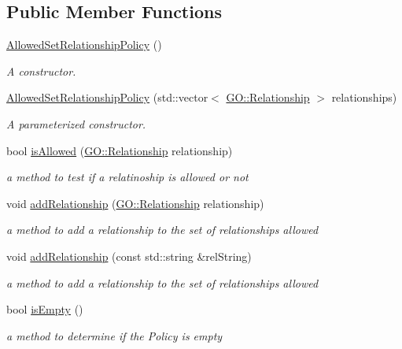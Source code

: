 \subsection*{Public Member Functions}
\begin{DoxyCompactItemize}
\item 
\hyperlink{classAllowedSetRelationshipPolicy_aebffb7e69930219d89133625ff8936cf}{Allowed\+Set\+Relationship\+Policy} ()
\begin{DoxyCompactList}\small\item\em A constructor. \end{DoxyCompactList}\item 
\hyperlink{classAllowedSetRelationshipPolicy_a9cd20d2c44a96736c0a74b7e962dae04}{Allowed\+Set\+Relationship\+Policy} (std\+::vector$<$ \hyperlink{namespaceGO_aaa3905b2e000a8be411da8038827f993}{G\+O\+::\+Relationship} $>$ relationships)
\begin{DoxyCompactList}\small\item\em A parameterized constructor. \end{DoxyCompactList}\item 
bool \hyperlink{classAllowedSetRelationshipPolicy_ac7454bc649241219f076779330977f90}{is\+Allowed} (\hyperlink{namespaceGO_aaa3905b2e000a8be411da8038827f993}{G\+O\+::\+Relationship} relationship)
\begin{DoxyCompactList}\small\item\em a method to test if a relatinoship is allowed or not \end{DoxyCompactList}\item 
void \hyperlink{classAllowedSetRelationshipPolicy_a5da8f3fb718fba44354e56a4595968de}{add\+Relationship} (\hyperlink{namespaceGO_aaa3905b2e000a8be411da8038827f993}{G\+O\+::\+Relationship} relationship)
\begin{DoxyCompactList}\small\item\em a method to add a relationship to the set of relationships allowed \end{DoxyCompactList}\item 
void \hyperlink{classAllowedSetRelationshipPolicy_a013089769911f87f1d8513bc6006dbf9}{add\+Relationship} (const std\+::string \&rel\+String)
\begin{DoxyCompactList}\small\item\em a method to add a relationship to the set of relationships allowed \end{DoxyCompactList}\item 
bool \hyperlink{classAllowedSetRelationshipPolicy_a543f028def505d8df941a308ab315075}{is\+Empty} ()
\begin{DoxyCompactList}\small\item\em a method to determine if the Policy is empty \end{DoxyCompactList}\end{DoxyCompactItemize}


